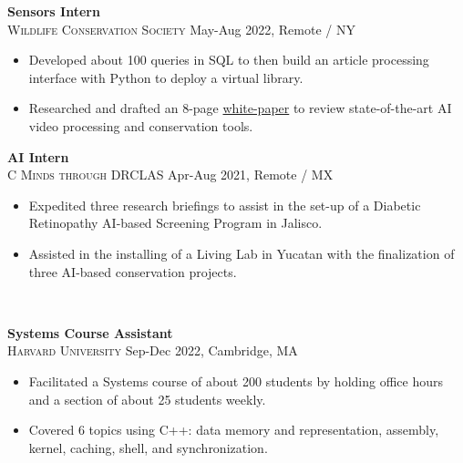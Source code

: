\documentclass[11pt]{article}
\begin{document}
    \noindent \textbf{Sensors Intern}\\
    \textsc{{Wildlife Conservation Society}} \hfill May-Aug 2022, Remote / NY
    \begin{itemize}[itemsep=-.4em, leftmargin=1em]\vspace{-2mm}
      \item Developed about 100 queries in SQL to then build an article processing interface with Python to deploy a virtual library.
      \item Researched and drafted an 8-page
      \href{https://bit.ly/AI-Advancing-Video-Processing-and-CTDS}{white-paper} to review state-of-the-art AI video processing and conservation tools.
    \end{itemize}

    \noindent \textbf{AI Intern}\\
    \textsc{{C Minds through DRCLAS}} \hfill Apr-Aug 2021, Remote / MX
    \begin{itemize}[itemsep=-.4em, leftmargin=1em]\vspace{-2mm}
      \item Expedited three research briefings to assist in the set-up of a Diabetic Retinopathy AI-based Screening Program in Jalisco. 
      \item Assisted in the installing of a Living Lab in Yucatan with the finalization of three AI-based conservation projects.
    \end{itemize}

  \vspace{-7pt}\\
  \noindent\makebox[\linewidth]{\rule{7.5in}{0.3pt}}


  \noindent\textbf{Systems Course Assistant}  \\
  \textsc{Harvard University} \hfill Sep-Dec 2022, Cambridge, MA
  \begin{itemize}[itemsep=-.4em, leftmargin=1em]\vspace{-2mm}
    \item Facilitated a Systems course of about 200 students by holding office hours and a section of about 25 students weekly.
    \item Covered 6 topics using C++: data memory and representation, assembly, kernel, caching, shell, and synchronization.
  \end{itemize}
\end{document}
